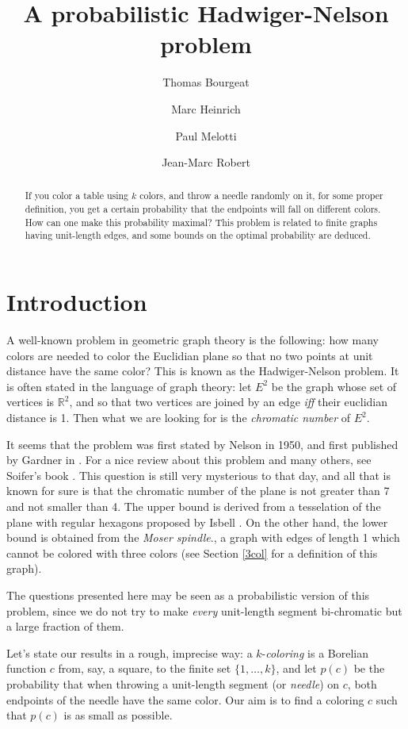 \documentclass[a4paper,11pt]{article}
\title{A probabilistic Hadwiger-Nelson problem}
\author[1]{Thomas Bourgeat}
\author[1]{Marc Heinrich}
\author[1]{Paul Melotti}
\affil[1]{Computer science department,\authorcr
\'Ecole Normale Sup\'erieure, Paris, France\authorcr
		  \texttt{\{first name\}.\{name\}@ens.fr}
}
\author[2]{Jean-Marc Robert}
\affil[2]{Software engineering and IT department,\authorcr
\'Ecole de Technologie Sup\'erieure, Montr\'eal, Canada\authorcr
		  \texttt{jean-marc.robert@etsmtl.ca}
}
\theoremstyle{definition}
\theoremstyle{remark}
\newcommand{\R}{\mathbb{R}}
\begin{document}
\maketitle

\begin{abstract} If you color a table using $k$ colors, and throw a needle
randomly on it, for some proper definition, you get a certain probability that the endpoints will fall on 
different colors. How can one make this probability maximal?
This problem is related to finite graphs having unit-length edges, and 
some bounds on the optimal probability are deduced.\end{abstract}

\section{Introduction}

A well-known problem in geometric graph theory is the following: how many colors
are needed to color the Euclidian plane so that no two points at unit distance have the 
same color? This is known as the Hadwiger-Nelson problem. It is often stated in 
the language of graph theory: let $E^2$ be the graph whose set of vertices is $\R^2$,
and so that two vertices are joined by an edge \textit{iff} their euclidian distance
is 1. Then what we are looking for is the \textit{chromatic number} of $E^2$.

It seems that the problem was first stated by Nelson in 1950, and first published by 
Gardner in \cite{gardner}.
For a nice review about this problem and many others, see Soifer's book
\cite{soifer}. This question is still very mysterious to that day, and all that 
is known for sure is that the chromatic number of the plane is not greater than
7 and not smaller than 4. The upper bound is derived from a tesselation of the 
plane with regular hexagons proposed by Isbell \cite{soifer}. On the other hand,
the lower bound is obtained from the \textit{Moser spindle}.\cite{moser}, a graph with edges
of length 1 which cannot be colored with three colors (see Section \ref{3col} for
a definition of this graph).

The questions presented here may be seen as a probabilistic version of this 
problem, since we do not try to make \textit{every} unit-length segment 
bi-chromatic but a large fraction of them.

\medskip

Let's state our results in a rough, imprecise way: a $k$-\textit{coloring} is a Borelian 
function $c$ from, say, a square, to the finite set $\{1, \dots , k \}$, and let $p(c)$ be the probability that when throwing a unit-length
segment (or \textit{needle}) on $c$, both endpoints of the needle have the same color.
Our aim is to find a coloring $c$ such that $p(c)$ is as small as possible.
\end{document}
